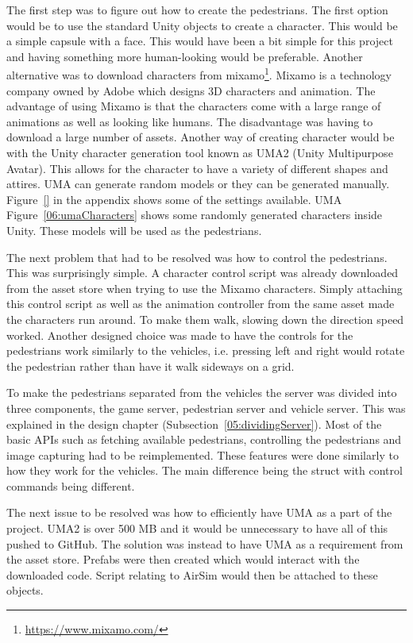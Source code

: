 The first step was to figure out how to create the pedestrians. The first option would be to use the standard Unity objects to create a character. This would be a simple capsule with a face. This would have been a bit simple for this project and having something more human-looking would be preferable. Another alternative was to download characters from mixamo\footnote{\url{ https://www.mixamo.com/}}. Mixamo is a technology company owned by Adobe which designs 3D characters and animation. The advantage of using Mixamo is that the characters come with a large range of animations as well as looking like humans. The disadvantage was having to download a large number of assets. Another way of creating character would be with the Unity character generation tool known as UMA2 (Unity Multipurpose Avatar). This allows for the character to have a variety of different shapes and attires. UMA can generate random models or they can be generated manually. Figure~\ref{} in the appendix shows some of the settings available. UMA  Figure~\ref{06:umaCharacters} shows some randomly generated characters inside Unity. These models will be used as the pedestrians. 

The next problem that had to be resolved was how to control the pedestrians. This was surprisingly simple. A character control script was already downloaded from the asset store when trying to use the Mixamo characters. Simply attaching this control script as well as the animation controller from the same asset made the characters run around. To make them walk, slowing down the direction speed worked. Another designed choice was made to have the controls for the pedestrians work similarly to the vehicles, i.e. pressing left and right would rotate the pedestrian rather than have it walk sideways on a grid. 

To make the pedestrians separated from the vehicles the server was divided into three components, the game server, pedestrian server and vehicle server. This was explained in the design chapter (Subsection~\ref{05:dividingServer}). Most of the basic APIs such as fetching available pedestrians, controlling the pedestrians and image capturing had to be reimplemented. These features were done similarly to how they work for the vehicles. The main difference being the struct with control commands being different. 

The next issue to be resolved was how to efficiently have UMA as a part of the project. UMA2 is over 500 MB and it would be unnecessary to have all of this pushed to GitHub. The solution was instead to have UMA as a requirement from the asset store. Prefabs were then created which would interact with the downloaded code. Script relating to AirSim would then be attached to these objects. 

